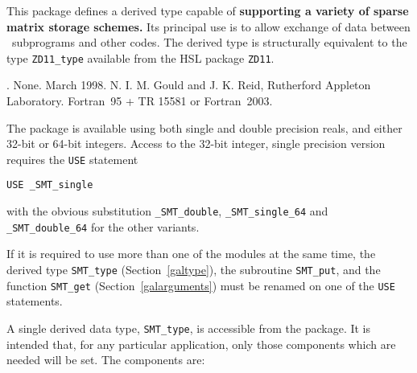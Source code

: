 \documentclass{galahad}
\newcommand{\packagename}{SMT}
\newcommand{\fullpackagename}{\libraryname\_\packagename}
\begin{document}
\galheader


\galsummary
This package defines a derived type capable of {\bf supporting 
a variety of sparse matrix storage schemes.} Its principal use is 
to allow exchange of data between \galahad\ subprograms  
and other codes. The derived type is structurally equivalent to 
the type {\tt ZD11\_type} available from the HSL package {\tt ZD11}.


\galattributes
\galversions{\tt  \fullpackagename\_single, \fullpackagename\_double}.
\galuses None.
\galdate March 1998.
\galorigin N. I. M. Gould and J. K. Reid, Rutherford Appleton Laboratory.
\gallanguage Fortran~95 + TR 15581 or Fortran~2003. 


\galhowto

The package is available using both single and double precision reals, 
and either 32-bit or 64-bit integers. Access to the 32-bit integer,
single precision version requires the {\tt USE} statement
\medskip

\hspace{8mm} {\tt USE \fullpackagename\_single}

\medskip
\noindent
with the obvious substitution {\tt \fullpackagename\_double},
{\tt \fullpackagename\_single\_64} and 
{\tt \fullpackagename\_double\_64} for the other variants.

\noindent
If it is required to use more than one of the modules at the same time, 
the derived type
{\tt \packagename\_type} 
(Section~\ref{galtype}),
the subroutine
{\tt \packagename\_put}, 
and the function
{\tt \packagename\_get} 
(Section~\ref{galarguments})
must be renamed on one of the {\tt USE} statements.





\galtype
A single derived data type, {\tt \packagename\_type},
is accessible from the package. It is intended that, for any particular
application, only those components which are needed will be set.
The components are:
\end{document}
